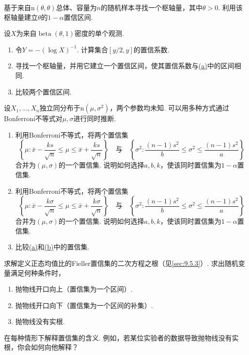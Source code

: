\begin{exercise}\label{exercise:9.12}
基于来自$\mathrm n(\theta,\theta)$总体、容量为$n$的随机样本寻找一个枢轴量，其中$\theta>0$. 利用该枢轴量建立$\theta$的$1-\alpha$置信区间.
\end{exercise}
\begin{exercise}\label{exercise:9.13}
设$X$为来自$\operatorname{beta}(\theta,1)$密度的单个观测.
\begin{enumerate}
\item\label{item:9.13.a}令$Y=-(\log X)^{-1}$. 计算集合$[y/2,y]$的置信系数.
\item 寻找一个枢轴量，并用它建立一个置信区间，使其置信系数与\hyperref[item:9.13.a]{(a)}中的区间相同.
\item 比较两个置信区间.
\end{enumerate}
\end{exercise}
\begin{exercise}\label{exercise:9.14}
设$X_1,\ldots,X_n$独立同分布于$\mathrm n(\mu,\sigma^2)$，两个参数均未知. 可以用多种方式通过Bonferroni不等式对$\mu,\sigma$进行同时推断.
\begin{enumerate}
\item\label{item:9.14.a}利用Bonferroni不等式，将两个置信集
$$\left\{\mu:\bar x-\frac{ks}{\sqrt n}\le\mu\le\bar x+\frac{ks}{\sqrt n}\right\}\quad\text{与}\quad\left\{\sigma^2:\frac{(n-1)s^2}b\le\sigma^2\le\frac{(n-1)s^2}a\right\}$$
合并为$(\mu,\sigma)$的一个置信集. 说明如何选择$a,b,k$，使该同时置信集为$1-\alpha$置信集.
\item\label{item:9.14.b}利用Bonferroni不等式，将两个置信集
$$\left\{\mu:\bar x-\frac{k\sigma}{\sqrt n}\le\mu\le\bar x+\frac{k\sigma}{\sqrt n}\right\}\quad\text{与}\quad\left\{\sigma^2:\frac{(n-1)s^2}b\le\sigma^2\le\frac{(n-1)s^2}a\right\}$$
合并为$(\mu,\sigma)$的一个置信集. 说明如何选择$a,b,k$，使该同时置信集为$1-\alpha$置信集.
\item 比较\hyperref[item:9.14.a]{(a)}和\hyperref[item:9.14.b]{(b)}中的置信集.
\end{enumerate}
\end{exercise}
\begin{exercise}\label{exercise:9.15}
求解定义正态均值比的Fieller置信集的二次方程之根（见\autoref{sec:9.5.3}）. 求出随机变量满足何种条件时，
\begin{enumerate}
\item 抛物线开口向上（置信集为一个区间）.
\item 抛物线开口向下（置信集为一个区间的补集）.
\item 抛物线没有实根.
\end{enumerate}
在每种情形下解释置信集的含义. 例如，若某位实验者的数据导致抛物线没有实根，你会如何向他解释？
\end{exercise}
